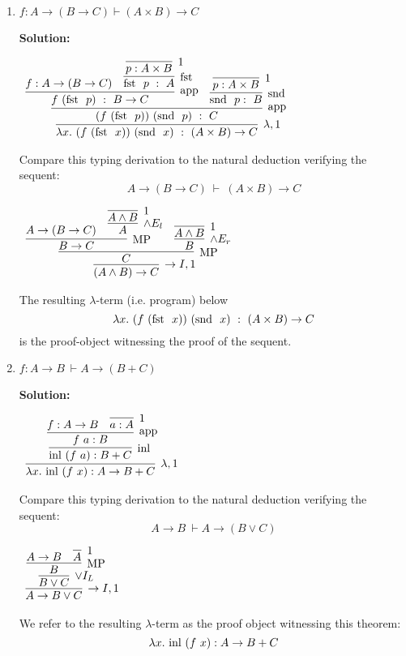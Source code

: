 \documentclass[11pt]{report}
\begin{document}
\begin{enumerate}
\begin{enumerate}
		\item $f : A \rightarrow ( B \rightarrow  C) \vdash ( A\times  B) \rightarrow C$
			
			{\bf Solution:}
				\begin{center}
					$\begin{array}{c}
						\infer[\lambda,1]{\lambda x. \ (f \ (\fst \ x)) \ (\snd \ x) \ : \ (A\times B)\to C}
							{\infer[\app]{(f \ (\fst \ p)) \ (\snd \ p) \ : \ C}
								{\infer[\app]{f \ (\fst \ p) \ : \ B\to C}
									{f : A \to (B \to C)
									&
									\infer[\fst]{\fst \ p \ : \ A}
										{\infer[1]{p : A\times B}
											{}}}
								&
								\infer[\snd]{\snd \ p : \ B}
									{\infer[1]{p : A\times B}
										{}}}}
					\end{array}$
				\end{center}
			Compare this typing derivation to the natural deduction verifying the sequent: 
			$$A \rightarrow (B \rightarrow  C) \ \vdash \ (A \times  B) \rightarrow  C $$

				\begin{center}
					$\begin{array}{c}
						\infer[\to I,1]{(A\land B)\to C}
							{\infer[\MP]{C}
								{\infer[\MP]{B\to C}
									{A \to (B \to C)
									&
									\infer[\land E_{l}]{A}
										{\infer[1]{A\land B}
											{}}}
								&
								\infer[\land E_{r}]{B}
									{\infer[1]{A\land B}
										{}}}}
					\end{array}$
				\end{center}
			The resulting $\lambda$-term (i.e. program) below
			$$ \lambda x. \ (f \ (\fst \ x)) \ (\snd \ x) \ : \ (A\times B)\to C$$
			is the proof-object witnessing the proof of the sequent.

		\newpage
		\item $f : A \to B \ \vdash A \to (B + C)$
		
		{\bf Solution:}
		\begin{center}
			$\begin{array}{c}
				\infer[\lambda,1]{\lambda x. \ \inl (f \ x) : A \to B + C}
					{\infer[\inl]{\inl (f \ a) : B + C}
						{\infer[\app]{f \ a : B}
							{f : A \to B
							&
							\infer[1]{a : A}{}}}}
			\end{array}$
		\end{center}
		Compare this typing derivation to the natural deduction verifying the sequent: 
		$$A \to B \ \vdash A \to (B \lor C)$$
		\begin{center}
			$\begin{array}{c}
				\infer[\to I,1]{A \to B \lor C}
					{\infer[\lor I_{L}]{B \lor C}
						{\infer[\MP]{B}
							{A \to B
							&
							\infer[1]{A}{}}}}
			\end{array}$
		\end{center}
		We refer to the resulting $\lambda$-term as the proof object witnessing this theorem:
		$$\lambda x. \ \text{inl } (f \ x) : A \to B + C$$
		

\end{enumerate}
\end{enumerate}
\end{document}
